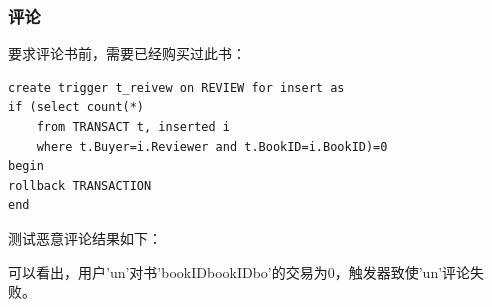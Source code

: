 \documentclass[UTF8, a4paper, 11pt]{article}
\begin{document}
\subsubsection{评论}
要求评论书前，需要已经购买过此书：
\begin{lstlisting}
create trigger t_reivew on REVIEW for insert as
if (select count(*)
    from TRANSACT t, inserted i
    where t.Buyer=i.Reviewer and t.BookID=i.BookID)=0
begin
rollback TRANSACTION
end
\end{lstlisting}
测试恶意评论结果如下：
\begin{figure}[H]
\end{figure}
可以看出，用户'un'对书'bookIDbookIDbo'的交易为0，触发器致使'un'评论失败。
\end{document}
